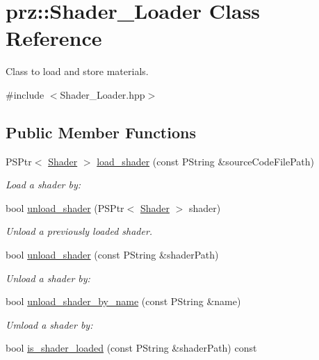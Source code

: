 \hypertarget{classprz_1_1_shader___loader}{}\section{prz\+::Shader\+\_\+\+Loader Class Reference}
\label{classprz_1_1_shader___loader}


Class to load and store materials.  




{\ttfamily \#include $<$Shader\+\_\+\+Loader.\+hpp$>$}

\subsection*{Public Member Functions}
\begin{DoxyCompactItemize}
\item 
P\+S\+Ptr$<$ \mbox{\hyperlink{classprz_1_1_shader}{Shader}} $>$ \mbox{\hyperlink{classprz_1_1_shader___loader_a00a1b6d36b4266b59a98b5493e38ec8b}{load\+\_\+shader}} (const P\+String \&source\+Code\+File\+Path)
\begin{DoxyCompactList}\small\item\em Load a shader by\+: \end{DoxyCompactList}\item 
bool \mbox{\hyperlink{classprz_1_1_shader___loader_abfc5a4768307f2f4d25311e8a0fe602c}{unload\+\_\+shader}} (P\+S\+Ptr$<$ \mbox{\hyperlink{classprz_1_1_shader}{Shader}} $>$ shader)
\begin{DoxyCompactList}\small\item\em Unload a previously loaded shader. \end{DoxyCompactList}\item 
bool \mbox{\hyperlink{classprz_1_1_shader___loader_a5387d5939d4e4049ce2e79e5c0737cda}{unload\+\_\+shader}} (const P\+String \&shader\+Path)
\begin{DoxyCompactList}\small\item\em Unload a shader by\+: \end{DoxyCompactList}\item 
bool \mbox{\hyperlink{classprz_1_1_shader___loader_ad8290368553e59239f7e802823e0d542}{unload\+\_\+shader\+\_\+by\+\_\+name}} (const P\+String \&name)
\begin{DoxyCompactList}\small\item\em Umload a shader by\+: \end{DoxyCompactList}\item 
bool \mbox{\hyperlink{classprz_1_1_shader___loader_a3e3cd98317d6006182fd03cfbf29b468}{is\+\_\+shader\+\_\+loaded}} (const P\+String \&shader\+Path) const

\end{DoxyCompactItemize}
